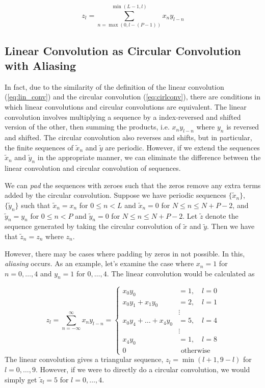 \documentclass[12pt]{CSUNthesis}
\begin{document}
\begin{equation}
\label{eq:finite_lin_conv}
z_l = \sum_{n=\max(0,l-(P-1))}^{\min(L-1,l)} x_n y_{l-n}
\end{equation}

\subsection{Linear Convolution as Circular Convolution with Aliasing}
	In fact, due to the similarity of the definition of the linear convolution (\ref{eq:lin_conv}) and the circular convolution (\ref{eq:cirlconv}), there are conditions in which linear convolutions and circular convolutions are equivalent. The linear convolution involves multiplying a sequence by a index-reversed and shifted version of the other, then summing the products, i.e. $x_n y_{l-n}$ where $y_n$ is reversed and shifted. The circular convolution also reverses and shifts, but in particular, the finite sequences of $\tilde{x}_n$ and $\tilde{y}$ are periodic. However, if we extend the sequences $\tilde{x}_n$ and $\tilde{y}_n$ in the appropriate manner, we can eliminate the difference between the linear convolution and circular convolution of sequences. 
	
	We can \textit{pad} the sequences with zeroes such that the zeros remove any extra terms added by the circular convolution. Suppose we have periodic sequences $\{\tilde{x}_n\}$, $\{\tilde{y}_n\}$ such that $\tilde{x}_n = x_n$ for $0 \leq n < L$ and $\tilde{x}_n = 0$ for $N \leq n \leq N+P-2$, and $\tilde{y}_n = y_n$ for $0 \leq n < P$ and $\tilde{y}_n = 0$ for $N \leq n \leq N+P-2$. 
Let $\tilde{z}$ denote the sequence generated by taking the circular convolution of $\tilde{x}$ and $\tilde{y}$. Then we have that $\tilde{z}_n = z_n$ where $z_n$. 

	However, there may be cases where padding by zeros in not possible. In this, \textit{aliasing} occurs. As an example, let's examine the case where $x_n=1$ for $n=0,\dots,4$ and $y_n=1$ for $0,\dots,4$. The linear convolution would be calculated as
	
\begin{equation*}
z_l = \sum_{n=-\infty}^{\infty } x_n y_{l-n} = \begin{cases}
x_0 y_0 &= 1, \quad l=0\\
x_0 y_1 + x_1 y_0 &= 2, \quad l=1\\
& \vdots \\ 
x_0y_4 + \dots + x_4 y_0 &= 5, \quad l=4 \\
& \vdots \\
x_4y_0 &= 1, \quad l= 8 \\
0 &\text{ otherwise}
\end{cases}
\end{equation*}
	The linear convolution gives a triangular sequence, $z_l = \min(l+1,9-l)$ for $l=0, \dots, 9$. However, if we were to directly do a circular convolution, we would simply get $\tilde{z}_l = 5$ for $ l=0, \dots, 4$.
	
\end{document}
